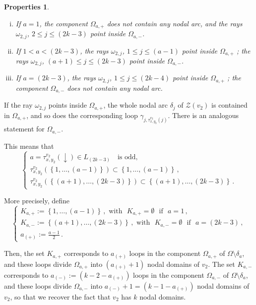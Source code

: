 \documentclass[12pt,a4paper]{amsart}
\theoremstyle{plain} %
\newtheorem{properties}[theorem]{Properties}
\theoremstyle{definition}
\numberwithin{equation}{section}
\numberwithin{figure}{section}
\numberwithin{table}{section}
\newcommand{\cZ}{\mathcal{Z}}
\newcommand{\sm}{\!\setminus\!}
\newcommand{\set}[1]{\left\lbrace #1 \right\rbrace}
\begin{document}
{\begin{properties}\label{P-hmn-v2}\phantom{}
\begin{enumerate}[(i)]
  \item If $a = 1$, the component $\Omega_{a,+}$ does not contain any nodal arc, and the rays $\omega_{2,j}$, $2 \le j \le (2k-3)$ point inside $\Omega_{a,-}$.
  \item If $1 < a < (2k-3)$, the rays $\omega_{2,j}$, $1 \le j \le (a-1)$ point inside $\Omega_{a,+}$ ; the rays $\omega_{2,j}$, $(a+1) \le j \le (2k-3)$ point inside $\Omega_{a,-}$.
  \item If $a = (2k-3)$, the rays $\omega_{2,j}$, $1 \le j \le (2k-4)$ point inside $\Omega_{a,+}$ ; the component $\Omega_{a,-}$ does not contain any nodal arc.
\end{enumerate}
\end{properties}%


If the ray $\omega_{2,j}$ points inside $\Omega_{a,+}$, the whole nodal arc $\delta_{j}$ of $\cZ(v_2)$ is contained in $\Omega_{a,+}$, and so does the corresponding loop $\gamma_{j,\tau_{x,y_2}^{v_2}(j)}$. There is an analogous statement for $\Omega_{a,-}$. \smallskip

This means that
%
\begin{equation}\label{E-hmn-206c}
\left\{
\begin{array}{l}
a = \tau_{x,y_2}^{v_2}(\downarrow) \in L_{(2k-3)} \text{~~ is odd,}\\[5pt]
\tau_{x,y_2}^{v_2}\left(\set{1,\ldots,(a-1)}\right) \subset \set{1,\ldots,(a-1)}\,, \\[5pt]
\tau_{x,y_2}^{v_2}\left(\set{(a+1),\ldots,(2k-3)}\right) \subset \set{(a+1),\ldots,(2k-3)}\,.
\end{array}
\right.
\end{equation}
%


More precisely, define
%
\begin{equation}\label{E-hmn-208}
\left\{
\begin{array}{l}
K_{a,+} := \set{1,\ldots,(a-1)}\,, \text{~with~~} K_{a,+} = \emptyset \text{~~if~~} a=1\,,\\[5pt]
K_{a,-} := \set{(a+1),\ldots,(2k-3)}\,, \text{~with~~} K_{a,-} = \emptyset \text{~~if~~} a=(2k-3)\,,\\[5pt]
a_{(+)} := \frac{a-1}{2}\,.
\end{array}
\right.
\end{equation}

Then, the set $K_{a,+}$ corresponds to $a_{(+)}$ loops in the component $\Omega_{a,+}$ of $\Omega\sm \delta_a$, and these loops divide $\Omega_{a,+}$ into $(a_{(+)}+1)$ nodal domains of $v_2$. The set $K_{a,-}$ corresponds to $a_{(-)} := (k-2-a_{(+)})$ loops in the component $\Omega_{a,-}$ of $\Omega\sm \delta_a$, and these loops divide $\Omega_{a,-}$ into $a_{(-)}+ 1 = (k-1-a_{(+)})$ nodal domains of $v_2$, so that we recover the fact that $v_2$ has $k$ nodal domains.\smallskip

}
\end{document}
